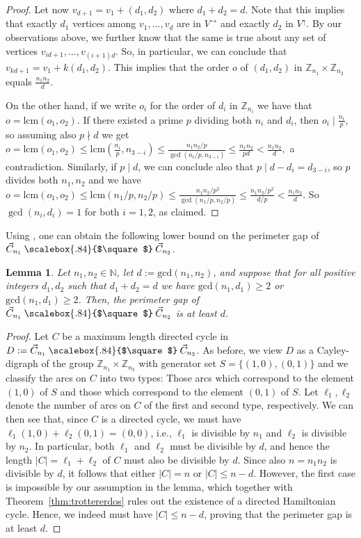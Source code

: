 \documentclass[english,11pt]{article}
\newtheorem{lemma}[theorem]{Lemma}
\theoremstyle{definition}
\numberwithin{equation}{section}
\numberwithin{figure}{section}
\newcommand\car{\mathbin{\text{\scalebox{.84}{$\square$}}}}
\begin{document}
\begin{proof}
    Let now $v_{d+1}=v_1+(d_1,d_2)$ where $d_1+d_2=d$. Note that this implies that exactly $d_1$ vertices among $v_1,\ldots, v_d$ are in $V^{\rightarrow}$ and exactly $d_2$ in $V^{\uparrow}$. By our observations above, we further know that the same is true about any set of vertices $v_{id+1},\ldots, v_{(i+1)d}$. So, in particular, we can conclude that $v_{kd+1}=v_1+k(d_1,d_2)$.
    This implies that the order $o$ of $(d_1,d_2)$ in $\mathbb{Z}_{n_1}\times \mathbb{Z}_{n_2}$ equals $\frac{n_1n_2}{d}$.

    On the other hand, if we write $o_i$ for the order of $d_i$ in $\mathbb{Z}_{n_i}$ we have that $o=\mathrm{lcm}(o_1,o_2)$.
    If there existed a prime $p$ dividing both $n_i$ and $d_i$, then $o_i \mid \frac{n_i}{p}$, so assuming also $p \nmid d$ we get $o=\mathrm{lcm}(o_1,o_2) \le \mathrm{lcm}(\frac{n_i}{p},n_{3-i})\le \frac{n_1n_2/p}{\gcd(n_i/p,n_{3-i})}\le \frac{n_1n_2}{pd}<\frac{n_1n_2}{d},$ a contradiction. Similarly, if $p \mid d$, we can conclude also that $p \mid d-d_i=d_{3-i}$, so $p$ divides both $n_1,n_2$ and we have  $o=\mathrm{lcm}(o_1,o_2) \le \mathrm{lcm}(n_1/p,n_{2}/p)\le \frac{n_1n_2/p^2}{\gcd(n_1/p,n_2/p)}\le \frac{n_1n_2/p^2}{d/p}<\frac{n_1n_2}{d}.$ So $\gcd(n_i,d_i)=1$ for both $i=1,2$, as claimed.
\end{proof}

Using , one can obtain the following lower bound on the perimeter gap of $\vec{C}_{n_1}\car \vec{C}_{n_2}$.

\begin{lemma}\label{lem:pergap}
Let $n_1, n_2\in \mathbb{N}$, let $d:=\mathrm{gcd}(n_1,n_2)$, and suppose that for all positive integers $d_1, d_2$ such that $d_1+d_2=d$ we have $\mathrm{gcd}(n_1,d_1)\ge 2$ or $\mathrm{gcd}(n_1,d_1)\ge 2$. Then, the perimeter gap of $\vec{C}_{n_1}\car \vec{C}_{n_2}$ is at least $d$.
\end{lemma}
\begin{proof}
    Let $C$ be a maximum length directed cycle in $D:=\vec{C}_{n_1}\car \vec{C}_{n_2}$. As before, we view $D$ as a Cayley-digraph of the group $\mathbb{Z}_{n_1}\times \mathbb{Z}_{n_2}$ with generator set $S=\{(1,0),(0,1)\}$ and we classify the arcs on $C$ into two types: Those arcs which correspond to the element $(1,0)$ of $S$ and those which correspond to the element $(0,1)$ of $S$. Let $\ell_1, \ell_2$ denote the number of arcs on $C$ of the first and second type, respectively. We can then see that, since $C$ is a directed cycle, we must have $\ell_1(1,0)+\ell_2(0,1)=(0,0)$, i.e., $\ell_1$ is divisible by $n_1$ and $\ell_2$ is divisible by $n_2$. In particular, both $\ell_1$ and $\ell_2$ must be divisible by $d$, and hence the length $|C|=\ell_1+\ell_2$ of $C$ must also be divisible by $d$. Since also $n=n_1n_2$ is divisible by $d$, it follows that either $|C|=n$ or $|C|\le n-d$. However, the first case is impossible by our assumption in the lemma, which together with Theorem~\ref{thm:trottererdos} rules out the existence of a directed Hamiltonian cycle. Hence, we indeed must have $|C|\le n-d$, proving that the perimeter gap is at least $d$. 
\end{proof}
\end{document}
